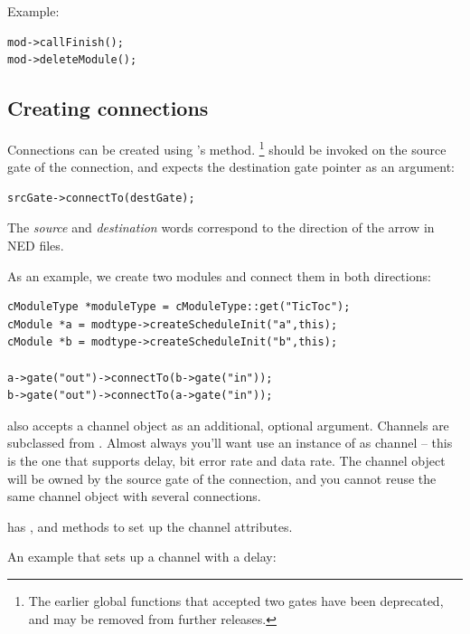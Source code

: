 Example:

\begin{verbatim}
mod->callFinish();
mod->deleteModule();
\end{verbatim}


\subsection{Creating connections}

Connections can be created using 's 
method.
  \footnote{The earlier  global functions that
  accepted two gates have been deprecated, and may be removed
  from further {\opp} releases.}
 should be invoked on the source gate
of the connection, and expects the destination gate pointer as
an argument:

\begin{verbatim}
srcGate->connectTo(destGate);
\end{verbatim}

The \textit{source} and \textit{destination} words correspond
to the direction of the arrow in NED files.

As an example, we create two modules and connect them in both directions:

\begin{verbatim}
cModuleType *moduleType = cModuleType::get("TicToc");
cModule *a = modtype->createScheduleInit("a",this);
cModule *b = modtype->createScheduleInit("b",this);

a->gate("out")->connectTo(b->gate("in"));
b->gate("out")->connectTo(a->gate("in"));
\end{verbatim}

 also accepts a channel object as an
additional, optional argument. Channels are subclassed from
. Almost always you'll want use an instance of
 as channel -- this is the one that supports
delay, bit error rate 
and data rate. The channel object will
be owned by the source gate of the connection, and you cannot
reuse the same channel object with several connections.

 has , 
and  methods to set up the channel attributes.

An example that sets up a channel with a delay:

